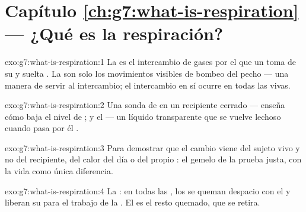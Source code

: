 \section*{Capítulo \ref{ch:g7:what-is-respiration} --- ¿Qué es la respiración?}

\begin{solution}{exo:g7:what-is-respiration:1}
La  es el intercambio de gases por el que un  toma
 de su  y suelta . La  son
solo los movimientos visibles de bombeo del pecho --- una manera de
servir al intercambio; el intercambio en sí ocurre en todas las 
vivas.
\end{solution}

\begin{solution}{exo:g7:what-is-respiration:2}
Una sonda de  en un recipiente cerrado --- enseña cómo baja el
nivel de ; y el  --- un líquido transparente que se
vuelve lechoso cuando pasa por él .
\end{solution}

\begin{solution}{exo:g7:what-is-respiration:3}
Para demostrar que el cambio viene del sujeto vivo y no del recipiente,
del calor del día o del propio : el gemelo de la prueba
justa, con la vida como única diferencia.
\end{solution}

\begin{solution}{exo:g7:what-is-respiration:4}
La : en todas las , los  se queman despacio con
el  y liberan su  para el trabajo de la . El
 es el resto quemado, que se retira.
\end{solution}

